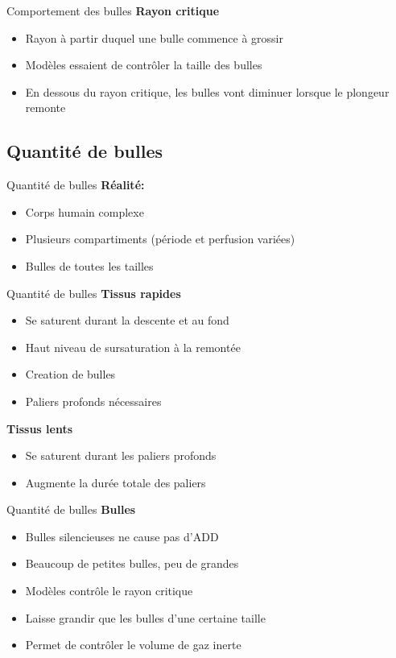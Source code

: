 \begin{frame}{Comportement des bulles}
	\textbf{Rayon critique}
	\begin{itemize}
		\item Rayon à partir duquel une bulle commence à grossir
		\item Modèles essaient de contrôler la taille des bulles
		\item En dessous du rayon critique, les bulles vont diminuer lorsque le plongeur remonte
	\end{itemize}
\end{frame}

\subsection{Quantité de bulles}

\begin{frame}{Quantité de bulles}  
	\textbf{Réalité:}
	\begin{itemize}
		\item Corps humain complexe
		\item Plusieurs compartiments (période et perfusion variées)
		\item Bulles de toutes les tailles
	\end{itemize}
\end{frame}

\begin{frame}{Quantité de bulles}
	\textbf{Tissus rapides}
	\begin{itemize}
		\item Se saturent durant la descente et au fond
		\item Haut niveau de sursaturation à la remontée
		\item Creation de bulles
		\item Paliers profonds nécessaires
	\end{itemize}
	\vfill
	\textbf{Tissus lents}
	\begin{itemize}
		\item Se saturent durant les paliers profonds
		\item Augmente la durée totale des paliers
	\end{itemize}
\end{frame}

\begin{frame}{Quantité de bulles}  
	\textbf{Bulles}
	\begin{itemize}
		\item Bulles silencieuses ne cause pas d'ADD
		\item Beaucoup de petites bulles, peu de grandes
		\item Modèles contrôle le rayon critique
		\item Laisse grandir que les bulles d'une certaine taille
		\item Permet de contrôler le volume de gaz inerte
	\end{itemize}
\end{frame}

